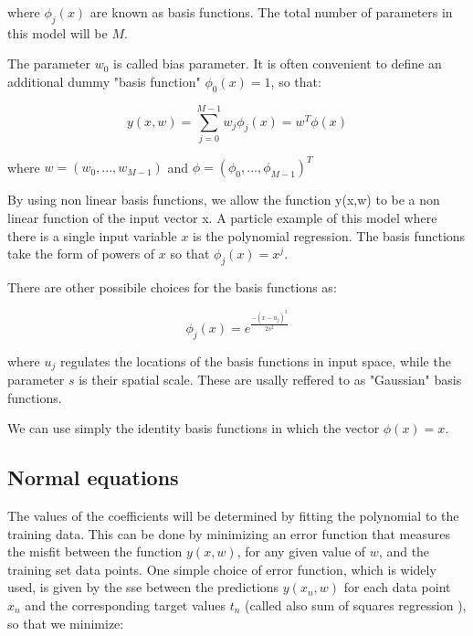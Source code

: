 \noindent where $\phi_j(x)$ are known as basis functions. The total number of parameters in this model will be $M$.

\noindent The parameter $w_0$ is called bias parameter. It is often convenient to define an additional dummy "basis function" $\phi_0(x)=1$, so that:

\begin{Equation}[H]
	\centering
	\begin{equation}
	y(x,w)=\sum_{j=0}^{M-1}w_j \phi_j(x) = w^T\phi(x)
	\end{equation}
	\label{eq:mathmodela}
\end{Equation}

\noindent where $w=(w_0,...,w_{M-1})$ and $\phi=(\phi_0,...,\phi_{M-1})^T$

\noindent By using non linear basis functions, we allow the function y(x,w) to be a non linear function of the input vector x.  A particle example of this model where there is a single input variable $x$ is the polynomial regression. The basis functions take the form of powers of $x$ so that $\phi_j(x)=x^j$.

\noindent There are other possibile choices for the basis functions as:

\begin{Equation}[H]
	\centering
	\begin{equation}
		\phi_j(x)=e^{\frac{-(x-u_j)^2}{2s^2}}
	\end{equation}
	\label{eq:mathmodela}
\end{Equation}

\noindent where $u_j$ regulates the locations of the basis functions in input space, while the parameter $s$ is their spatial scale. These are usally reffered to as "Gaussian" basis functions. 

\noindent We can use simply the identity basis functions in which the vector $\phi(x)=x$.

\subsection{Normal equations}
\label{subsec:reglinmulnormeq}
The values of the coefficients will be determined by fitting the polynomial to the training data. This can be done by minimizing an error function that measures the misfit between the function $y(x, w)$, for any given value of $w$, and the training set data points. One simple choice of error function, which is widely used, is given by the \gls{sse} between the predictions $y(x_n, w)$ for each data point $x_n$ and the corresponding target values $t_n$ (called also sum of squares regression \cite[]{sum-squares}), so that we minimize:

